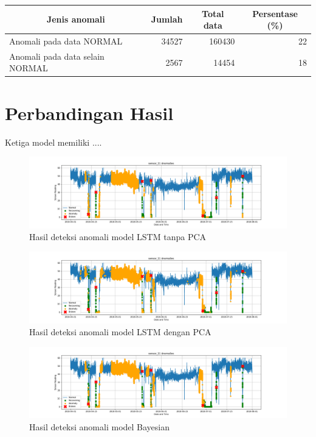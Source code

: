 \begin{table}[h]
    \centering
    \begin{tabular}{|l|r|r|r|}
        \hline
        \multicolumn{1}{|c|}{\textbf{Jenis anomali}} & \multicolumn{1}{c|}{\textbf{Jumlah}} & \multicolumn{1}{c|}{\textbf{Total data}} & \multicolumn{1}{c|}{\textbf{Persentase (\%)}} \\ \hline
        Anomali pada data NORMAL                     & 34527                                & 160430                                   & 22                                       \\ \hline
        Anomali pada data selain NORMAL              & 2567                                 & 14454                                    & 18                                       \\ \hline
    \end{tabular}
\end{table}

\section{Perbandingan Hasil}
Ketiga model memiliki ....

\begin{figure}[h]
    \centering
    \includegraphics[width=\textwidth]{resources/LSTM/LSTM_noPCA_sensor_11.png}
    \caption{Hasil deteksi anomali model LSTM tanpa PCA}
\end{figure}
\begin{figure}[h]
    \centering
    \includegraphics[width=\textwidth]{resources/LSTM/LSTM_PCA_sensor_11.png}
    \caption{Hasil deteksi anomali model LSTM dengan PCA}
\end{figure}
\begin{figure}[h]
    \centering
    \includegraphics[width=\textwidth]{resources/Bayes/Bayes_sensor_11.png}
    \caption{Hasil deteksi anomali model Bayesian}
\end{figure}